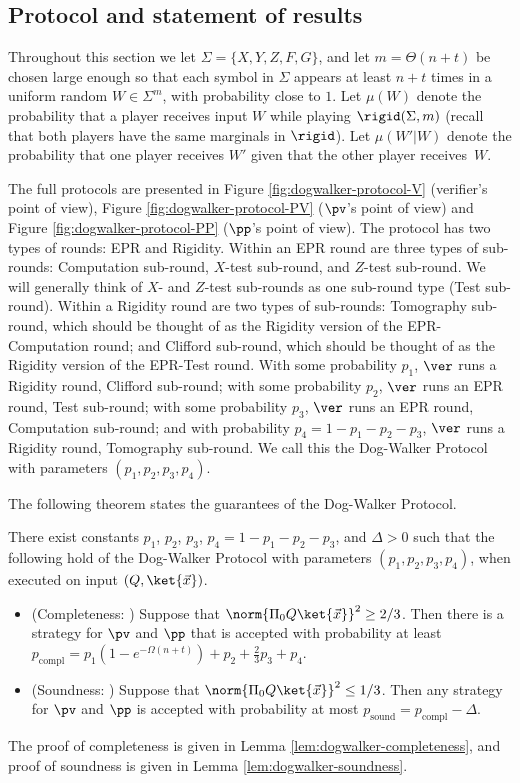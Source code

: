 \subsection{Protocol and statement of results}


Throughout this section we 
let $\Sigma=\{X,Y,Z,F,G\}$, and let $m=\Theta(n+t)$ be chosen 
large enough so that each symbol in $\Sigma$ appears at least $n+t$ times in a uniform random $W\in\Sigma^m$, with probability close to $1$.
Let $\mu({W})$ denote the probability that a player receives input ${W}$ while playing $\rigid(\Sigma,m)$ (recall that both players have the same marginals in $\rigid$). Let $\mu({W}'|{W})$ denote the probability that one player receives ${W}'$ given that the other player receives~${W}$. 

The full protocols are presented in Figure \ref{fig:dogwalker-protocol-V} (verifier's point of view), Figure \ref{fig:dogwalker-protocol-PV} ($\pv$'s point of view) and Figure \ref{fig:dogwalker-protocol-PP} ($\pp$'s point of view). The protocol has two 
types of rounds: 
EPR and Rigidity. Within an EPR round are three 
types of sub-rounds: 
Computation sub-round, $X$-test sub-round, and $Z$-test sub-round. We will generally think of $X$- and $Z$-test sub-rounds as one sub-round type (Test sub-round). Within a Rigidity round are two types of sub-rounds: Tomography sub-round, which should be thought of as the Rigidity version of the EPR-Computation round; and Clifford sub-round, which should be thought of as the Rigidity version of the EPR-Test round. With some probability $p_1$, $\ver$ runs a Rigidity round, Clifford sub-round; with some probability $p_2$, $\ver$ runs an EPR round, Test sub-round; with some probability $p_3$, $\ver$ runs an EPR round, Computation sub-round; and with probability $p_4=1-p_1-p_2-p_3$, $\ver$ runs a Rigidity round, Tomography sub-round. We call this the Dog-Walker Protocol with parameters $(p_1,p_2,p_3,p_4)$.


The following theorem states the guarantees of the Dog-Walker Protocol.

\begin{theorem}\label{thm:dog-walker}
There exist constants $p_1$, $p_2$, $p_3$, $p_4=1-p_1-p_2-p_3$, and $\Delta>0$ such that the following hold of the Dog-Walker Protocol with parameters $(p_1,p_2,p_3,p_4)$, when executed on input $(Q,\ket{\vec{x}})$.
\begin{itemize}
\item (Completeness: ) Suppose that $\norm{\Pi_0Q\ket{\vec{x}}}^2\geq 2/3$. Then
  there is a strategy for $\pv$ and $\pp$ that is accepted with probability at
    least $p_{\mathrm{compl}}=p_1(1-e^{-\Omega(n+t)})+p_2+\frac{2}{3}p_3 +
    p_4$. 
\item (Soundness: ) Suppose that $\norm{\Pi_0Q\ket{\vec{x}}}^2\leq 1/3$. Then any strategy for $\pv$ and $\pp$ is accepted with probability at most $p_{\mathrm{sound}}=p_{\mathrm{compl}}-\Delta$. 
\end{itemize}
\end{theorem}
\noindent The proof of completeness is given in Lemma \ref{lem:dogwalker-completeness}, and proof of soundness is given in Lemma \ref{lem:dogwalker-soundness}. 


